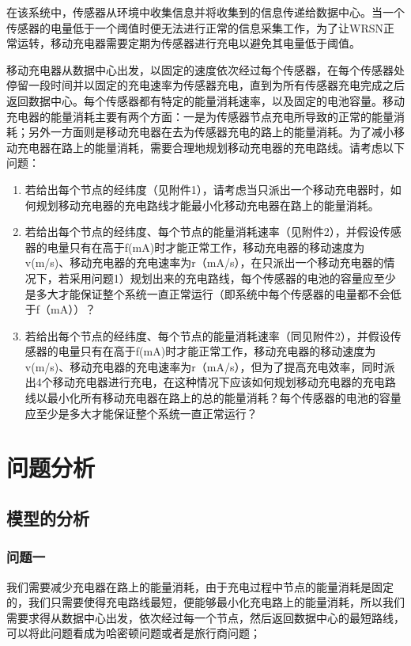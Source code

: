 \documentclass{article}
\begin{document}
在该系统中，传感器从环境中收集信息并将收集到的信息传递给数据中心。当一个传感器的电量低于一个阈值时便无法进行正常的信息采集工作，为了让WRSN正常运转，移动充电器需要定期为传感器进行充电以避免其电量低于阈值。

移动充电器从数据中心出发，以固定的速度依次经过每个传感器，在每个传感器处停留一段时间并以固定的充电速率为传感器充电，直到为所有传感器充电完成之后返回数据中心。每个传感器都有特定的能量消耗速率，以及固定的电池容量。移动充电器的能量消耗主要有两个方面：一是为传感器节点充电所导致的正常的能量消耗；另外一方面则是移动充电器在去为传感器充电的路上的能量消耗。为了减小移动充电器在路上的能量消耗，需要合理地规划移动充电器的充电路线。请考虑以下问题：
\begin{enumerate}[\indent 1.]
\item 若给出每个节点的经纬度（见附件1），请考虑当只派出一个移动充电器时，如何规划移动充电器的充电路线才能最小化移动充电器在路上的能量消耗。

\item 若给出每个节点的经纬度、每个节点的能量消耗速率（见附件2），并假设传感器的电量只有在高于f(mA)时才能正常工作，移动充电器的移动速度为v(m/s)、移动充电器的充电速率为r（mA/s），在只派出一个移动充电器的情况下，若采用问题1）规划出来的充电路线，每个传感器的电池的容量应至少是多大才能保证整个系统一直正常运行（即系统中每个传感器的电量都不会低于f（mA））？

\item 若给出每个节点的经纬度、每个节点的能量消耗速率（同见附件2），并假设传感器的电量只有在高于f(mA)时才能正常工作，移动充电器的移动速度为v(m/s)、移动充电器的充电速率为r（mA/s），但为了提高充电效率，同时派出4个移动充电器进行充电，在这种情况下应该如何规划移动充电器的充电路线以最小化所有移动充电器在路上的总的能量消耗？每个传感器的电池的容量应至少是多大才能保证整个系统一直正常运行？
\end{enumerate}
\newpage
\section{问题分析}
\subsection{模型的分析}
\subsubsection{问题一}
我们需要减少充电器在路上的能量消耗，由于充电过程中节点的能量消耗是固定的，我们只需要使得充电路线最短，便能够最小化充电路上的能量消耗，所以我们需要求得从数据中心出发，依次经过每一个节点，然后返回数据中心的最短路线，可以将此问题看成为哈密顿问题或者是旅行商问题；
\end{document}
